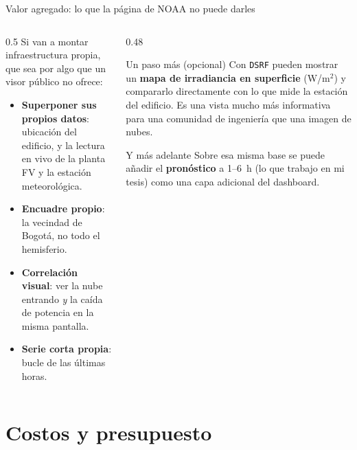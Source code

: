 \documentclass[10pt,aspectratio=169]{beamer}
\begin{document}
\begin{frame}{Valor agregado: lo que la página de NOAA no puede darles}
  \begin{columns}[T]
    \begin{column}{0.5\textwidth}
      Si van a montar infraestructura propia, que sea por algo que un visor
      público no ofrece:
      \begin{itemize}\small
        \item \textbf{Superponer sus propios datos}: ubicación del edificio,
              y la lectura en vivo de la planta FV y la estación meteorológica.
        \item \textbf{Encuadre propio}: la vecindad de Bogotá, no todo el
              hemisferio.
        \item \textbf{Correlación visual}: ver la nube entrando \emph{y} la
              caída de potencia en la misma pantalla.
        \item \textbf{Serie corta propia}: bucle de las últimas horas.
      \end{itemize}
    \end{column}
    \begin{column}{0.48\textwidth}
      \begin{block}{Un paso más (opcional)}
        \small
        Con \texttt{DSRF} pueden mostrar un \textbf{mapa de irradiancia en
        superficie} (W/m$^2$) y compararlo directamente con lo que mide la
        estación del edificio. Es una vista mucho más informativa para una
        comunidad de ingeniería que una imagen de nubes.
      \end{block}
      \begin{block}{Y más adelante}
        \small
        Sobre esa misma base se puede añadir el \textbf{pronóstico} a 1--6~h
        (lo que trabajo en mi tesis) como una capa adicional del dashboard.
      \end{block}
    \end{column}
  \end{columns}
\end{frame}

\section{Costos y presupuesto}
\end{document}
